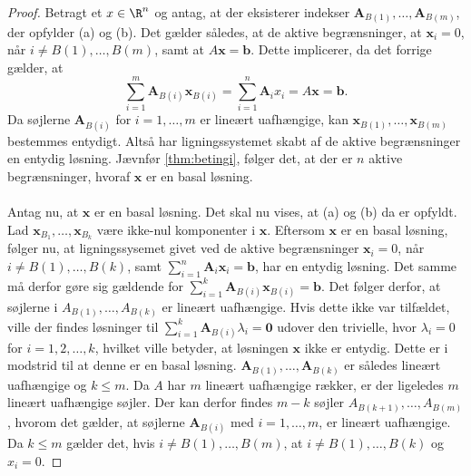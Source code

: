 \begin{proof}
Betragt et $x \in \R^n$ og antag, at der eksisterer indekser $\mathbf{A}_{B(1)},\ldots,\mathbf{A}_{B(m)}$, der opfylder (a) og (b).
%
Det gælder således, at de aktive begrænsninger, at $\textbf{x}_i=0$, når $i\neq B(1),\ldots,B(m)$, samt at $A\textbf{x}=\mathbf{b}$.
Dette implicerer, da det forrige gælder,  at 
%
$$\sum_{i=1}^{m}\textbf{A}_{B(i)}\textbf{x}_{B(i)}=\sum_{i=1}^{n}\textbf{A}_ix_i=A\textbf{x}=\textbf{b}.$$
%
Da søjlerne $\textbf{A}_{B(i)}$ for $i=1,\ldots,m$ er lineært uafhængige, kan $\textbf{x}_{B(1)},\ldots,\textbf{x}_{B(m)}$ bestemmes entydigt. 
Altså har ligningssystemet skabt af de aktive begrænsninger en entydig løsning.
Jævnfør \ref{thm:betingi},
følger det, at der er $n$ aktive begrænsninger, hvoraf $\mathbf{x}$ er en basal løsning. 
\\\\
%
%
Antag nu, at $\mathbf{x}$ er en basal løsning. 
Det skal nu vises, at (a) og (b) da er opfyldt.
Lad $\textbf{x}_{B_1},\ldots,\textbf{x}_{B_k}$ være ikke-nul komponenter i $\textbf{x}$.
Eftersom $\mathbf{x}$ er en basal løsning, følger nu, at ligningssysemet givet ved de aktive begrænsninger $\textbf{x}_i=0$, når $i\neq B(1),\ldots,B(k)$, samt  $\sum_{i=1}^{n}\mathbf{A}_i\textbf{x}_i=\mathbf{b}$, har en entydig løsning. 
Det samme må derfor gøre sig gældende for $\sum_{i=1}^{k}\mathbf{A}_{B(i)}\textbf{x}_{B(i)}=\mathbf{b}$.
Det følger derfor, at søjlerne i $A_{B(1)},\ldots,A_{B(k)}$ er lineært uafhængige.
%
Hvis dette ikke var tilfældet, ville der findes løsninger til $\sum_{i=1}^{k}\mathbf{A}_{B(i)} \lambda_i=\mathbf{0}$ udover den trivielle, hvor $\lambda_i=0$ for $i=1,2,\ldots,k$, hvilket ville betyder, at løsningen $\mathbf{x}$ ikke er entydig. 
Dette er i modstrid til at denne er en basal løsning.
$\mathbf{A}_{B(1)},\ldots ,\mathbf{A}_{B(k)}$ er således lineært uafhængige og $k \leq m$.
Da $A$ har $m$ lineært uafhængige rækker, er der ligeledes $m$ lineært uafhængige søjler.
Der kan derfor findes $m-k$ søjler $A_{B(k+1)},\ldots,A_{B(m)}$, hvorom det gælder, at søjlerne $\mathbf{A}_{B(i)}$ med $i=1,\ldots,m$, er lineært uafhængige.
Da $k \leq m$ gælder det, hvis $i \neq B(1),\ldots,B(m)$, at $i \neq B(1),\ldots,B(k)$ og $x_i=0$.
%
\end{proof}
\\
